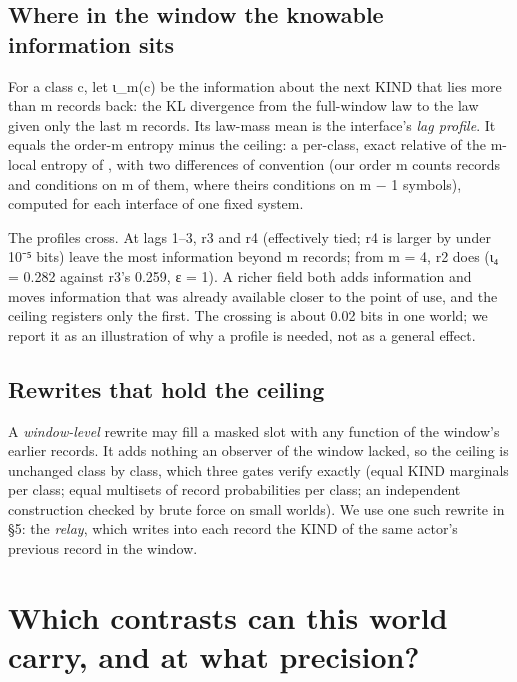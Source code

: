 \documentclass[10pt]{article}
\begin{document}
\hypertarget{where-in-the-window-the-knowable-information-sits}{%
\subsection{Where in the window the knowable information sits}\label{where-in-the-window-the-knowable-information-sits}}

For a class c, let ι\_m(c) be the information about the next KIND that lies more than m records back: the KL divergence
from the full-window law to the law given only the last m records. Its law-mass mean is the interface's \emph{lag profile}.
It equals the order-m entropy minus the ceiling: a per-class, exact relative of the m-local entropy of
\citet{someya2025locality}, with two differences of convention (our order m counts records and conditions on m of them, where
theirs conditions on m − 1 symbols), computed for each interface of one fixed system.

The profiles cross. At lags 1--3, r3 and r4 (effectively tied; r4 is larger by under 10⁻⁵ bits) leave the most
information beyond m records; from m = 4, r2 does (ι₄ = 0.282 against r3's 0.259, ε = 1). A richer field both adds
information and moves information that was already available closer to the point of use, and the ceiling registers
only the first. The crossing is about 0.02 bits in one world; we report it as an illustration of why a profile is
needed, not as a general effect.

\hypertarget{rewrites-that-hold-the-ceiling}{%
\subsection{Rewrites that hold the ceiling}\label{rewrites-that-hold-the-ceiling}}

A \emph{window-level} rewrite may fill a masked slot with any function of the window's earlier records. It adds nothing an
observer of the window lacked, so the ceiling is unchanged class by class, which three gates verify exactly (equal KIND
marginals per class; equal multisets of record probabilities per class; an independent construction checked by brute
force on small worlds). We use one such rewrite in §5: the \emph{relay}, which writes into each record the KIND of the same
actor's previous record in the window.

\hypertarget{which-contrasts-can-this-world-carry-and-at-what-precision}{%
\section{Which contrasts can this world carry, and at what precision?}\label{which-contrasts-can-this-world-carry-and-at-what-precision}}
\end{document}
